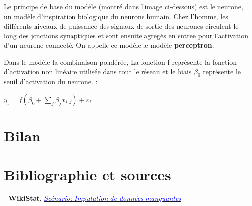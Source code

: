 \documentclass[14pt, openany]{article}
\begin{document}
Le principe de base du modèle (montré dans l'image ci-dessous) est le neurone, un modèle d'inspiration biologique du neurone humain. Chez l'homme, les différents niveaux de puissance des signaux de sortie des neurones circulent le long des jonctions synaptiques et sont ensuite agrégés en entrée pour l'activation d'un neurone connecté. On appelle ce modèle le modèle \textbf{perceptron}.

Dans le modèle la combinaison pondérée, La fonction f représente la fonction d'activation non linéaire utilisée dans tout le réseau et le biais $\beta_{0} $ représente le seuil d'activation du neurone. :
\begin{center}
$y_{i}=f(\beta_{0} + \sum\limits_{j} \beta_{j}x_{i,j}) + \varepsilon_{i}$
\end{center}


\section{Bilan}

\section{Bibliographie et sources}

\begin{flushleft}
- \textbf{WikiStat}, \href{https://www.math.univ-toulouse.fr/~besse/Wikistat/pdf/st-scenar-app-idm.pdf}{\textit{\textcolor{blue}{Scénario: Imputation de données manquantes}}}\\
\medskip
\end{flushleft}
\end{document}
